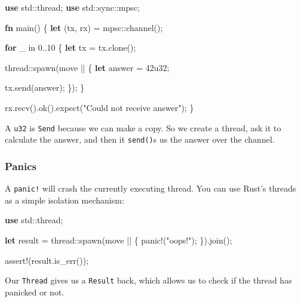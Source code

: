 \documentclass[a4paper,]{book}
\newenvironment{Shaded}{\begin{snugshade}}{\end{snugshade}}
\newcommand{\KeywordTok}[1]{\textcolor[rgb]{0.13,0.29,0.53}{\textbf{{#1}}}}
\newcommand{\DecValTok}[1]{\textcolor[rgb]{0.00,0.00,0.81}{{#1}}}
\newcommand{\StringTok}[1]{\textcolor[rgb]{0.31,0.60,0.02}{{#1}}}
\newcommand{\OtherTok}[1]{\textcolor[rgb]{0.56,0.35,0.01}{{#1}}}
\newcommand{\NormalTok}[1]{{#1}}
\begin{document}
\begin{Shaded}
\begin{Highlighting}[]
\KeywordTok{use} \NormalTok{std::thread;}
\KeywordTok{use} \NormalTok{std::sync::mpsc;}

\KeywordTok{fn} \NormalTok{main() \{}
    \KeywordTok{let} \NormalTok{(tx, rx) = mpsc::channel();}

    \KeywordTok{for} \NormalTok{_ in }\DecValTok{0.}\NormalTok{.}\DecValTok{10} \NormalTok{\{}
        \KeywordTok{let} \NormalTok{tx = tx.clone();}

        \NormalTok{thread::spawn(move || \{}
            \KeywordTok{let} \NormalTok{answer = }\DecValTok{42u32}\NormalTok{;}

            \NormalTok{tx.send(answer);}
        \NormalTok{\});}
    \NormalTok{\}}

   \NormalTok{rx.recv().ok().expect(}\StringTok{"Could not receive answer"}\NormalTok{);}
\NormalTok{\}}
\end{Highlighting}
\end{Shaded}

A \texttt{u32} is \texttt{Send} because we can make a copy. So we create
a thread, ask it to calculate the answer, and then it \texttt{send()}s
us the answer over the channel.

\subsubsection{Panics}\label{panics}

A \texttt{panic!} will crash the currently executing thread. You can use
Rust's threads as a simple isolation mechanism:

\begin{Shaded}
\begin{Highlighting}[]
\KeywordTok{use} \NormalTok{std::thread;}

\KeywordTok{let} \NormalTok{result = thread::spawn(move || \{}
    \OtherTok{panic!}\NormalTok{(}\StringTok{"oops!"}\NormalTok{);}
\NormalTok{\}).join();}

\OtherTok{assert!}\NormalTok{(result.is_err());}
\end{Highlighting}
\end{Shaded}

Our \texttt{Thread} gives us a \texttt{Result} back, which allows us to
check if the thread has panicked or not.

\end{document}
